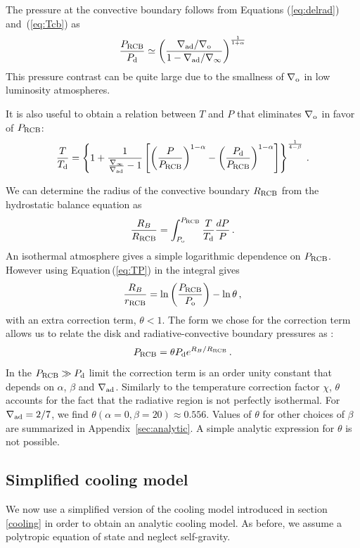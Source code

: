 \documentclass[apj]{emulateapj}
\newcommand{\delad}{\nabla_{\rm ad}}
\newcommand{\Eq}[1]{Equation\,(\ref{#1})}
\newcommand{\Eqs}[2]{Equations (\ref{#1}) and~(\ref{#2})}
\newcommand{\App}[1]{Appendix~\ref{#1}}
\newcommand{\di}{_{\rm o}}
\newcommand{\cb}{_{\rm RCB}}
\begin{document}
The pressure at the convective boundary  follows from \Eqs{eq:delrad}{eq:Tcb} as
\begin{equation}
{P\cb\over P_{\rm d}} \simeq \left({\delad/\nabla\di \over 1 - \delad/\nabla_\infty}\right)^{1 \over 1 + \alpha}
\end{equation} 
This pressure contrast can be quite large due to the smallness of $\nabla\di$ in low luminosity atmospheres.
 
 It is also useful to obtain a relation between $T$ and $P$ that eliminates $\nabla\di$ in favor of $P\cb$:
 \begin{equation}\label{eq:TP}
{T \over T_{\rm d}} = \left\{1 + {1 \over {\nabla_\infty \over \delad} - 1} \left[ \left({P \over P\cb}\right)^{1-\alpha} -  \left({P_{\rm d} \over P\cb}\right)^{1-\alpha}  \right] \right\}^{1 \over 4-\beta}\, .
\end{equation} 
 
We can determine the radius of the convective boundary $R\cb$ from the hydrostatic balance equation as 
\begin{equation}\label{eq:RCBint}
{R_B \over R\cb} = \int_{P\di}^{P\cb} {T \over T_{\rm d}} {dP \over P}\, .
\end{equation} 
An isothermal atmosphere gives a simple logarithmic dependence on $P\cb$.  However using \Eq{eq:TP} in the integral gives
\begin{equation}\label{eq:Rcb}
{R_B \over r\cb} = \ln \left(P\cb \over P\di \right) - \ln \theta \, ,
\end{equation} 
with an extra correction term, $\theta < 1$.  The form we chose for the correction term allows us to relate the disk and radiative-convective boundary pressures as :
 \begin{equation}\label{eq:PcbRcb}
P\cb = \theta P_{\rm d} e^{R_B/R\cb} \, .
\end{equation}   
In the $P\cb \gg P_{\rm d}$ limit the correction term is an order unity constant that depends on $\alpha$, $\beta$ and $\delad$. Similarly to the temperature correction factor $\chi$,  $\theta$ accounts for the fact that the radiative region is not perfectly isothermal. For $\delad=2/7$, we find $\theta(\alpha=0, \beta=20) \approx 0.556$. Values of $\theta$ for other choices of $\beta$ are summarized in \App{sec:analytic}.  A simple analytic expression for $\theta$ is not possible.  




\subsection{Simplified cooling model}
We now use a simplified version of the cooling model introduced in section \ref{cooling} in order to obtain an analytic cooling model. As before, we assume a polytropic equation of state and neglect self-gravity.
\end{document}

